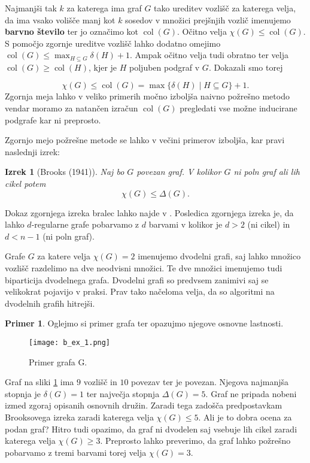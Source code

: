 \documentclass[12pt,a4paper,twoside]{article}
\theoremstyle{definition} %
\newtheorem{primer}[definicija]{Primer}
\theoremstyle{plain} %
\newtheorem{izrek}[definicija]{Izrek}
\numberwithin{equation}{section}  %
\DeclareMathOperator{\col}{col}
\begin{document}
Najmanjši tak $k$ za katerega ima graf $G$ tako ureditev vozlišč za katerega velja, da ima vsako volišče manj kot $k$ sosedov v množici prejšnjih vozlič  imenujemo \textbf{barvno število} ter jo označimo kot $\col(G)$. Očitno velja $\chi(G) \le \col(G)$. S pomočjo zgornje ureditve vozlišč lahko dodatno omejimo $\col(G) \le  \max_{H \subseteq G} \delta(H) + 1$. Ampak očitno velja tudi obratno ter velja $\col(G) \ge \col(H)$, kjer je $H$ poljuben podgraf v $G$. Dokazali smo torej 

$$ \chi(G) \le \col(G) = \max\{\delta(H) \mid H \subseteq G\} + 1.$$
Zgornja meja lahko v veliko primerih močno izboljša naivno požrešno metodo vendar moramo za natančen izračun $\col(G)$ pregledati vse možne inducirane podgrafe kar ni preprosto.

Zgornjo mejo požrešne metode se lahko v večini primerov izboljša, kar pravi naslednji izrek:
\begin{izrek}[Brooks (1941)]
Naj bo $G$ povezan graf. V kolikor $G$ ni poln graf ali lih cikel potem
$$\chi(G) \le \Delta(G) .$$

\end{izrek}
Dokaz zgornjega izreka bralec lahko najde v \cite{maingraph}. Posledica zgornjega izreka je, da lahko $d$-regularne grafe pobarvamo z $d$ barvami v kolikor je $d> 2$ (ni cikel) in $d < n-1$ (ni poln graf).

Grafe $G$ za katere velja $\chi(G) = 2$ imenujemo dvodelni grafi, saj lahko množico vozlišč razdelimo na dve neodvisni množici. Te dve množici imenujemo tudi biparticija dvodelnega grafa. Dvodelni grafi so predvsem zanimivi saj se velikokrat pojavijo v praksi. Prav tako načeloma velja, da so algoritmi na dvodelnih grafih hitrejši. 

\begin{primer}
Oglejmo si primer grafa ter opazujmo njegove osnovne lastnosti.
 \begin{figure}[h!]
\caption{Primer grafa G.}
\label{basic_ex}
\centering
    \texttt{[image: b\_ex\_1.png]}
    \end{figure}
Graf na sliki \ref{basic_ex} ima $9$ vozlišč in $10$ povezav ter je povezan. Njegova najmanjša stopnja je $\delta(G) = 1$ ter največja stopnja $\Delta(G) = 5$. Graf ne pripada nobeni izmed zgoraj opisanih osnovnih družin. Zaradi tega zadošča predpostavkam Brooksovega izreka zaradi katerega velja $\chi(G) \le 5$. Ali je to dobra ocena za podan graf? Hitro tudi opazimo, da graf ni dvodelen saj vsebuje lih cikel zaradi katerega velja $\chi(G) \ge 3$. Preprosto lahko preverimo, da graf lahko požrešno pobarvamo z tremi barvami torej velja $\chi(G) = 3$.
\end{primer}
\end{document}
